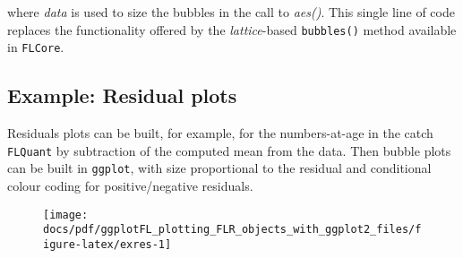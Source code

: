 \documentclass[]{article}
\newenvironment{Shaded}{\begin{snugshade}}{\end{snugshade}}
\newcommand{\KeywordTok}[1]{\textcolor[rgb]{0.13,0.29,0.53}{\textbf{{#1}}}}
\newcommand{\DataTypeTok}[1]{\textcolor[rgb]{0.13,0.29,0.53}{{#1}}}
\newcommand{\DecValTok}[1]{\textcolor[rgb]{0.00,0.00,0.81}{{#1}}}
\newcommand{\StringTok}[1]{\textcolor[rgb]{0.31,0.60,0.02}{{#1}}}
\newcommand{\NormalTok}[1]{{#1}}
\begin{document}
where \emph{data} is used to size the bubbles in the call to
\emph{aes()}. This single line of code replaces the functionality
offered by the \emph{lattice}-based \texttt{bubbles()} method available
in \texttt{FLCore}.

\subsection{Example: Residual plots}\label{example-residual-plots}

Residuals plots can be built, for example, for the numbers-at-age in the
catch \texttt{FLQuant} by subtraction of the computed mean from the
data. Then bubble plots can be built in \texttt{ggplot}, with size
proportional to the residual and conditional colour coding for
positive/negative residuals.

\begin{Shaded}
\end{Shaded}

\begin{figure}

{\centering \texttt{[image: docs/pdf/ggplotFL\_plotting\_FLR\_objects\_with\_ggplot2\_files/figure-latex/exres-1]} 

}

\end{figure}
\end{document}
